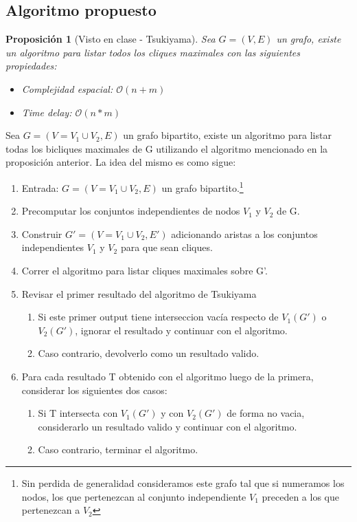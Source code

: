 \documentclass[10pt,a4paper]{article}
\newtheorem{proposition}{Proposici\'on}
\begin{document}
\subsection{Algoritmo propuesto}

\begin{proposition}[Visto en clase - Tsukiyama]
Sea $G = (V, E)$ un grafo, existe un algoritmo para listar todos los cliques maximales con las siguientes propiedades:
\begin{itemize}
    \item Complejidad espacial: $\mathcal{O}(n + m)$
    \item Time delay: $\mathcal{O}(n*m)$
\end{itemize}
\end{proposition}

Sea $G = ( V = V_1 \cup V_2, E)$ un grafo bipartito, existe un algoritmo para listar todas los bicliques maximales de G utilizando el algoritmo mencionado en la proposición anterior. La idea del mismo es como sigue:

\begin{enumerate}
    \item Entrada: $G = ( V = V_1 \cup V_2, E)$ un grafo bipartito.\footnote{Sin perdida de generalidad consideramos este grafo tal que si numeramos los nodos, los que pertenezcan al conjunto independiente $V_1$ preceden a los que pertenezcan a $V_2$}
    \item Precomputar los conjuntos independientes de nodos $V_1$ y $V_2$ de G.
    \item Construir $G' = (V = V_1 \cup V_2, E')$ adicionando aristas a los conjuntos independientes $V_1$ y $V_2$ para que sean cliques.
    \item Correr el algoritmo para listar cliques maximales sobre G'.
    \item Revisar el primer resultado del algoritmo de Tsukiyama
    \begin{enumerate}
        \item Si este primer output tiene interseccion vacía respecto de $V_1(G')$ o $V_2(G')$, ignorar el resultado y continuar con el algoritmo.
        \item Caso contrario, devolverlo como un resultado valido. 
    \end{enumerate}
    \item Para cada resultado T obtenido con el algoritmo luego de la primera, considerar los siguientes dos casos:
    \begin{enumerate}
        \item Si T intersecta con $V_1(G')$ y con $V_2(G')$ de forma no vacia, considerarlo un resultado valido y continuar con el algoritmo.
        \item Caso contrario, terminar el algoritmo.
    \end{enumerate}
\end{enumerate}
\end{document}
